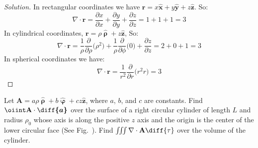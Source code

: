 \documentclass[crop=false,class=book,oneside]{standalone}
\begin{document}
            \begin{proof}[Solution]
                In rectangular coordinates we have
                $\mathbf{r}%
                 =x\hat{\mathbf{x}}%
                 +y\hat{\mathbf{y}}%
                 +z\hat{\mathbf{z}}$.
                So:
                \begin{equation*}
                    \nabla\cdot\mathbf{r}
                    =\frac{\partial x}{\partial x}
                    +\frac{\partial y}{\partial y}
                    +\frac{\partial z}{\partial z}
                    =1+1+1
                    =3
                \end{equation*}
                In cylindrical coordinates,
                $\mathbf{r}%
                 =\rho\hat{\boldsymbol{\uprho}}%
                 +z\hat{\mathbf{z}}$,
                So:
                \begin{equation*}
                    \nabla\cdot\mathbf{r}
                    =\frac{1}{\rho}
                    \frac{\partial}{\partial\rho}
                    \big(\rho^2\big)
                    +\frac{1}{\rho}
                    \frac{\partial}{\partial\phi}
                    \big(0\big)
                    +\frac{\partial z}{\partial z}
                    =2+0+1
                    =3
                \end{equation*}
                In spherical coordinates we have:
                \begin{equation*}
                    \nabla\cdot\mathbf{r}
                    =\frac{1}{r^{2}}
                    \frac{\partial}{\partial{r}}
                    \big(r^{2}r\big)
                    =3
                \end{equation*}
            \end{proof}
            \begin{problem}[Wangsness 1-22]
            \label{problem:EMAG_wangsness_1_22}
                Let
                $\mathbf{A}%
                 =a\rho\hat{\boldsymbol{\uprho}}%
                 +b\hat{\boldsymbol{\upvarphi}}%
                 +cz\hat{\mathbf{z}}$,
                where $a$, $b$, and $c$ are constants.
                Find $\oiint\mathbf{A}\cdot\boldsymbol{\diff{a}}$
                over the surface of a right circular cylinder of length
                $L$ and radius $\rho_{0}$ whose axis is along the
                positive $z$ axis and the origin is the center
                of the lower circular face
                (See Fig.~).
                Find $\iiint\nabla\cdot\mathbf{A}\diff{\tau}$
                over the volume of the cylinder.
            \end{problem}
\end{document}
